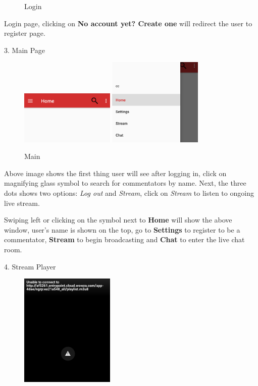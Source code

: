 \documentclass{article}
\begin{document}
\begin{flushleft}
\begin{figure}[H]
	\caption{Login}
	\label{fig:login}
\end{figure}
Login page, clicking on \textbf{No account yet? Create one} will redirect the user to register page.\par
{\large 3. Main Page}\par
\begin{figure}[H]
	\includegraphics[width=0.40\textwidth]{main}
	\hfill
	\includegraphics[width=0.40\textwidth]{main2}
	\caption{Main}
	\label{fig:main}
\end{figure}
Above image shows the first thing user will see after logging in, click on magnifying glass symbol to search for commentators by name. Next, the three dots shows two options: \textit{Log out} and \textit{Stream}, click on \textit{Stream} to listen to ongoing live stream.\par
Swiping left or clicking on the symbol next to \textbf{Home} will show the above window, user's name is shown on the top, go to \textbf{Settings} to register to be a commentator, \textbf{Stream} to begin broadcasting and \textbf{Chat} to enter the live chat room.\par
{\large 4. Stream Player}\par
\begin{figure}[H]
	\centering
	\includegraphics[width=0.40\textwidth]{player}

\end{figure}
\end{flushleft}
\end{document}
